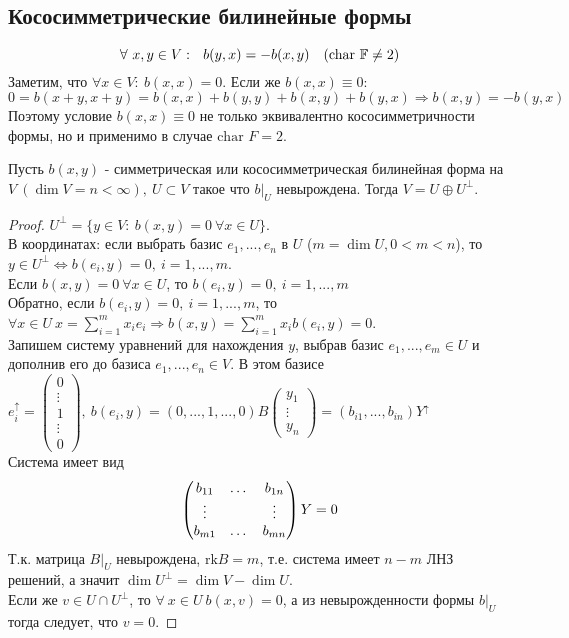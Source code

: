 \subsection{Кососимметрические билинейные формы}
$$\forall\ x,y \in V: \ \ b(y,x) = -b(x,y) \ \ \ (\text{char } \mathbb{F} \neq 2)$$
Заметим, что $\forall x\in V: \ b(x,x) = 0$. Если же $b(x, x) \equiv 0$:
$$0 = b(x+y,x+y) = b(x,x) + b(y,y) + b(x,y) + b(y,x) \Rightarrow b(x,y) = -b(y,x)$$
Поэтому условие $b(x,x) \equiv 0$ не только эквивалентно кососимметричности формы, но и применимо в случае $\text{char } F = 2$.
\begin{lemma}
    Пусть $b(x,y)$ - симметрическая или кососимметрическая билинейная форма на $V \ (\dim V = n < \infty), \ U\subset V$ такое что $b|_U$ невырождена. Тогда $V = U \oplus U^{\perp}$.
\end{lemma}
\begin{proof}
    $U^{\perp} = \{y\in V: \ b(x,y) = 0  \ \forall x\in U\}$.\\
    В координатах: если выбрать базис $e_1,...,e_n$ в $U$ ($m = \dim U, 0<m<n$), то $y \in U^{\perp} \Leftrightarrow b(e_i, y) = 0, \ i = 1,...,m$.\\
    Если $b(x,y) = 0 \ \forall x \in U$, то $b(e_i, y) = 0, \ i = 1,...,m$\\
    Обратно, если $b(e_i, y) = 0, \ i = 1,...,m$, то $\forall x \in U \ x = \sum \limits_{i=1}^m x_ie_i \Rightarrow b(x,y) = \sum \limits_{i=1}^m x_ib(e_i,y) = 0$.\\
    Запишем систему уравнений для нахождения $y$, выбрав базис $e_1,...,e_m \in U$ и дополнив его до базиса $e_1,...,e_n \in V$. В этом базисе $e_i^{\uparrow} = \begin{pmatrix} 0 \\ \vdots \\ 1 \\ \vdots \\ 0 \end{pmatrix}, \ b(e_i, y) = (0,...,1,...,0)B \begin{pmatrix} y_1 \\ \vdots \\ y_n \end{pmatrix} = (b_{i1},...,b_{in})Y^{\uparrow}$\\
    Система имеет вид 
    $$\begin{pmatrix}
        b_{11}&\dots&b_{1n}\\
        \vdots&\null&\vdots\\
        b_{m1}&\dots&b_{mn}
    \end{pmatrix} Y = 0$$
    Т.к. матрица $B|_U$ невырождена, $\text{rk} B = m$, т.е. система имеет $n-m$ ЛНЗ решений, а значит $\dim U^\perp = \dim V - \dim U$.\\
    Если же $v \in U\cap U^\perp$, то $\forall \ x\in U \ b(x,v) = 0$, а из невырожденности формы $b|_U$ тогда следует, что $v = 0$. 
\end{proof}
